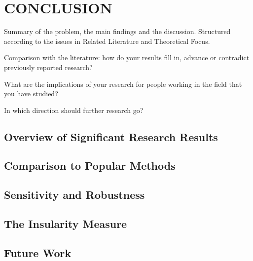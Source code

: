 \chapter{CONCLUSION} \label{ch:conclusion}%

Summary of the problem, the main findings and the discussion. Structured according to the issues in Related Literature and Theoretical Focus.

Comparison with the literature: how do your results fill in, advance or contradict previously reported research?

What are the implications of your research for people working in the field that you have studied?

In which direction should further research go?

\section{Overview of Significant Research Results} \label{sec:Overview} %

\section{Comparison to Popular Methods}

\section{Sensitivity and Robustness}

\section{The Insularity Measure}

\section{Future Work}

